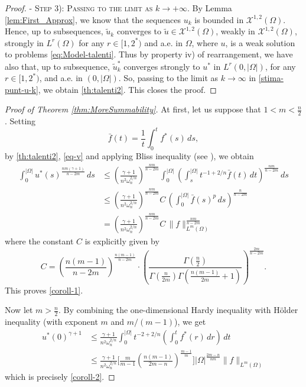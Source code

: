 \documentclass[11pt,a4paper]{amsart}
\def \XX {\mathcal{X}}
\theoremstyle{definition}
\theoremstyle{plain}
\numberwithin{equation}{section}
\begin{document}
{\begin{proof}
-\,\,\textsc{Step 3): Passing to the limit as $k \to +\infty$.} By Lemma \ref{lem:First_Approx}, we know that the sequences $u_k$ is bounded in $\XX^{1,2}(\Omega)$. Hence, up to subsequences, $\tilde u_k$ converges to $\tilde u \in \XX^{1,2}(\Omega)$, weakly in $\XX^{1,2}(\Omega)$, strongly in $L^r(\Omega)$ for any $r\in [1,2^\ast)$ and a.e. in $\Omega$, where $u$, is a weak solution to problems \eqref{eq:Model-talenti}. Thus by property iv) of rearrangement, we have also that, up to subsequence, $\tilde u_k^\ast$ converges strongly to $u^\ast$ in $L^r(0,|\Omega|)$, for any $r\in[1,2^\ast)$, and a.e. in $(0,|\Omega|).$ So, passing to the limit as $k\to\infty$ in \eqref{stima-punt-u-k}, we obtain \eqref{th:talenti2}. This closes the proof.
\end{proof}

\begin{proof}[Proof of Theorem \ref{thm:MoreSummability}]
At first, let us suppose that $1<m<\frac{n}{2}$. Setting 
$$\bar{f}(t)=\frac{1}{t} \int_{0}^{t} f^{*}(s) \,ds,$$ 
by \eqref{th:talenti2}, \eqref{eq-v} and applying Bliss inequality (see \cite{Bli}), we obtain
$$
\begin{aligned}
	\int_{0}^{|\Omega|} u^{*}(s)^{\frac{n m(\gamma+1)}{n-2m}} \, d s & \leq\left(\frac{\gamma+1}{n^{2} \omega_{n}^{2 / n}}\right)^{\frac{n m}{n-2m}} \int_{0}^{|\Omega|}\left(\int_{s}^{|\Omega|} t^{-1+2 / n} \bar{f}(t) \,d t\right)^{\frac{n m}{n-2 m}} \, d s \\
	& \leq\left(\frac{\gamma+1}{n^{2} \omega_{n}^{2 / n}}\right)^{\frac{n m}{n-2 m}} C\,\left(\int_{0}^{|\Omega|} \bar{f}(s)^{p} \, d s\right)^{\frac{n}{n-2 m}} \\
	& =\left(\frac{\gamma+1}{n^{2} \omega_{n}^{2 / n}}\right)^{\frac{n m}{n-2 m}} C\,\|f\|_{L^{m}(\Omega)}^{\frac{n m}{n-2 m}}
\end{aligned}
$$
where the constant $C$ is explicitly given by 
$$ C=
\left( \frac{n(m - 1)}{n - 2m} \right)^{\frac{n(m-1)}{n - 2m}} \cdot
\left( 
\frac{
	\Gamma\left(\frac{n}{2}\right)
}{
	\Gamma\left( \frac{n}{2m} \right)
	\Gamma\left( \frac{n(m - 1)}{2m} + 1 \right)
}
\right)^{\frac{2m}{n - 2m}}.$$ This proves \eqref{coroll-1}.
\medskip

Now let $m>\frac{n}{2}$. By combining the one-dimensional Hardy inequality with H\"older inequality (with exponent $m$ and $m/(m-1)$), we get
$$
\begin{aligned}
	u^{*}(0)^{\gamma+1} & \leq \frac{\gamma+1}{n^{2} \omega_{n}^{2 / n}} \int_{0}^{|\Omega|} t^{-2+2 / n}\left(\int_{0}^{t} f^{*}(r) \,d r\right) \,d t \\
	& \leq \frac{\gamma+1}{n^{2} \omega_{n}^{2 / n}}\Big[\frac{m}{m-1}\left(\frac{n(m-1)}{2 m-n}\right)^{\frac{m-1}{m}}\Big]|\Omega|^{\frac{2 m-n}{n m}}\|f\|_{L^{m}(\Omega)}
\end{aligned}
$$
which is precisely \eqref{coroll-2}.
\medskip


\end{proof}}
\end{document}
